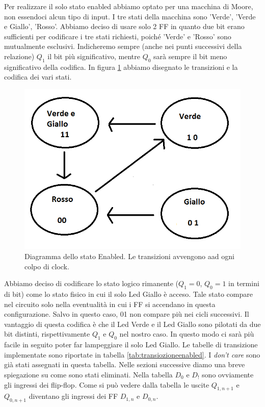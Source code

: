 \documentclass[10pt,a4paper]{article}
\begin{document}
Per realizzare il solo stato enabled abbiamo optato per una macchina di Moore, non essendoci alcun tipo di input. I tre stati della macchina sono 'Verde', 'Verde e Giallo', 'Rosso'. Abbiamo deciso di usare solo 2 FF in quanto due bit erano sufficienti per codificare i tre stati richiesti, poiché 'Verde' e 'Rosso' sono mutualmente esclusivi. Indicheremo sempre (anche nei punti successivi della relazione) $Q_1$ il bit più significativo, mentre $Q_0$ sarà sempre il bit meno significativo della codifica. In figura \ref{fig:FSMenabled} abbiamo disegnato le transizioni e la codifica dei vari stati.
\begin{figure}[!htb]
\centering
\includegraphics[scale=0.7]{FSMenabled.png}
\caption{Diagramma dello stato Enabled. Le transizioni avvengono aad ogni colpo di clock.\label{fig:FSMenabled}}
\end{figure}
Abbiamo deciso di codificare lo stato logico rimanente ($Q_1 = 0$, $Q_0 = 1$ in termini di bit) come lo stato fisico in cui il solo Led Giallo è acceso. Tale stato compare nel circuito solo nella eventualità in cui i FF si accendano in questa configurazione. Salvo in questo caso, 01 non compare più nei cicli successivi.
Il vantaggio di questa codifica è che il Led Verde e il Led Giallo sono pilotati da due bit distinti, rispettivamente $Q_1$ e $Q_0$ nel nostro caso. In questo modo ci sarà più facile in seguito poter far lampeggiare il solo Led Giallo.
Le tabelle di transizione implementate sono riportate in tabella \ref{tab:transiozioneenabled}. I \emph{don't care} sono già stati assegnati in questa tabella. Nelle sezioni successive diamo una breve spiegazione su come sono stati eliminati. Nella tabella $D_0$ e $D_!$ sono ovviamente gli ingressi dei flip-flop. Come si può vedere dalla tabella le uscite $Q_{1,n+1}$ e $Q_{0,n+1}$ diventano gli ingressi dei FF $D_{1, n}$ e $D_{0, n}$.
\end{document}

